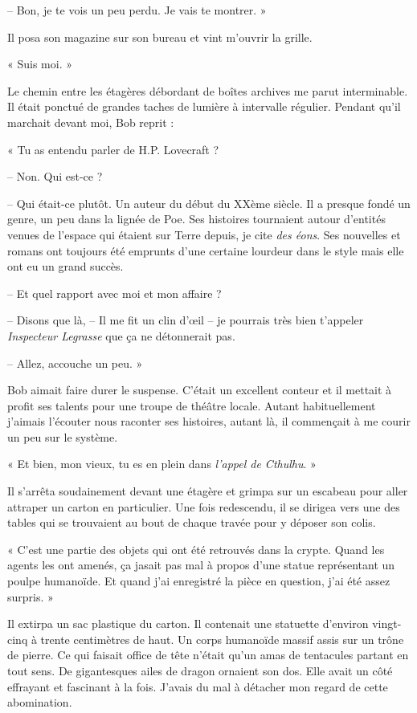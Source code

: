 -- Bon, je te vois un peu perdu. Je vais te montrer. »

Il posa son magazine sur son bureau et vint m'ouvrir la grille.

« Suis moi. »

Le chemin entre les étagères débordant de boîtes archives me parut interminable. Il était ponctué de grandes taches de
lumière à intervalle régulier. Pendant qu'il marchait devant moi, Bob reprit :

« Tu as entendu parler de H.P. Lovecraft ?

-- Non. Qui est-ce ?

-- Qui était-ce plutôt. Un auteur du début du XXème siècle. Il a presque fondé un genre, un peu dans la lignée de Poe.
Ses histoires tournaient autour d'entités venues de l'espace qui étaient sur Terre depuis, je cite \emph{des éons}. Ses
nouvelles et romans ont toujours été emprunts d'une certaine lourdeur dans le style mais elle ont eu un grand succès.

-- Et quel rapport avec moi et mon affaire ?

-- Disons que là, -- Il me fit un clin d'œil -- je pourrais très bien t'appeler \emph{Inspecteur Legrasse} que ça ne
détonnerait pas.

-- Allez, accouche un peu. »

Bob aimait faire durer le suspense. C'était un excellent conteur et il mettait à profit ses talents pour une troupe de
théâtre locale. Autant habituellement j'aimais l'écouter nous raconter ses histoires, autant là, il commençait à me
courir un peu sur le système.

« Et bien, mon vieux, tu es en plein dans \emph{l'appel de Cthulhu}. »

Il s'arrêta soudainement devant une étagère et grimpa sur un escabeau pour aller attraper un carton en particulier. Une
fois redescendu, il se dirigea vers une des tables qui se trouvaient au bout de chaque travée pour y déposer son colis.

« C'est une partie des objets qui ont été retrouvés dans la crypte. Quand les agents les ont amenés, ça jasait pas mal
à propos d'une statue représentant un poulpe humanoïde. Et quand j'ai enregistré la pièce en question, j'ai été assez
surpris. »

Il extirpa un sac plastique du carton. Il contenait une statuette d'environ vingt-cinq à trente centimètres de haut. Un
corps humanoïde massif assis sur un trône de pierre. Ce qui faisait office de tête n'était qu'un amas de tentacules
partant en tout sens. De gigantesques ailes de dragon ornaient son dos. Elle avait un côté effrayant et fascinant à la
fois. J'avais du mal à détacher mon regard de cette abomination.

